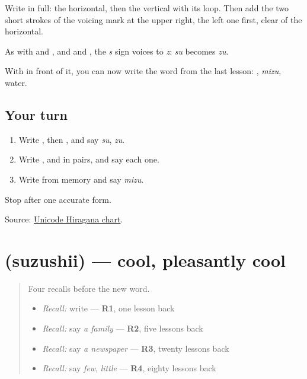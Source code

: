 Write \textbf{} in full: the horizontal, then the vertical with its loop. Then add the two short strokes of the voicing mark at the upper right, the left one first, clear of the horizontal.

As with \textbf{} and \textbf{}, and \textbf{} and \textbf{}, the \emph{s} sign voices to \emph{z}: \emph{su} becomes \emph{zu}.

With \textbf{} in front of it, you can now write the word from the last lesson: \textbf{}, \emph{mizu}, water.

\subsection*{Your turn}
\begin{enumerate}
\raggedright
  \item Write \textbf{}, then \textbf{}, and say \emph{su}, \emph{zu}.
  \item Write \textbf{ }, \textbf{ } and \textbf{ } in pairs, and say each one.
  \item Write \textbf{} from memory and say \emph{mizu}.
\end{enumerate}

\begin{tcolorbox}[breakable,colback=teal!4,colframe=teal!35!black,title={Before you move on}]
Stop after one accurate form.

Source: \href{https://www.unicode.org/charts/PDF/U3040.pdf}{Unicode Hiragana chart}.
\end{tcolorbox}
\section[\texorpdfstring{\ja{すずしい} (suzushii)}{すずしい (suzushii)}]{ (suzushii) — cool, pleasantly cool}

\label{lesson:JA-C136-suzushii}



\begin{quote}
Four recalls before the new word.

\begin{itemize}
\raggedright
  \item \emph{Recall:} write \textbf{} — \textbf{R1}, one lesson back
  \item \emph{Recall:} say \emph{a family} — \textbf{R2}, five lessons back
  \item \emph{Recall:} say \emph{a newspaper} — \textbf{R3}, twenty lessons back
  \item \emph{Recall:} say \emph{few}, \emph{little} — \textbf{R4}, eighty lessons back
\end{itemize}
\end{quote}


